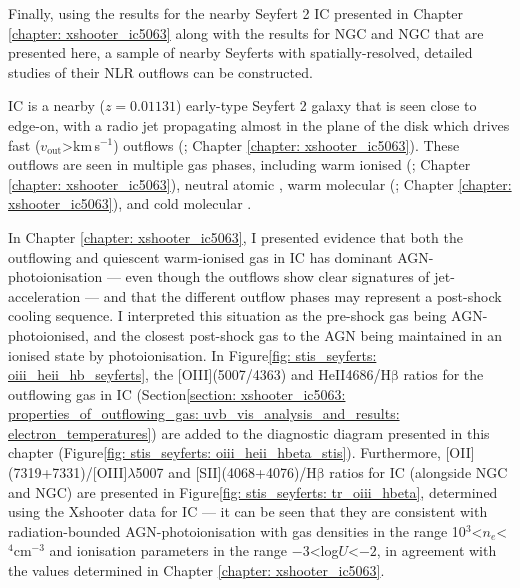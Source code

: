 Finally, using the results for the nearby Seyfert 2 IC presented in Chapter \ref{chapter: xshooter_ic5063} along with the results for NGC and NGC that are presented here, a sample of nearby Seyferts with spatially-resolved, detailed studies of their NLR outflows can be constructed.

IC is a nearby ($z=0.01131$) early-type Seyfert 2 galaxy that is seen close to edge-on, with a radio jet propagating almost in the plane of the disk which drives fast (\mbox{$v_\mathrm{out}$\;\textgreater{}\;km\,s$^{-1}$}) outflows (\citealt{Morganti1998, Oosterloo2000, Morganti2015, Mukherjee2018}; Chapter \ref{chapter: xshooter_ic5063}). These outflows are seen in multiple gas phases, including warm ionised (\citealt{Morganti2007, Sharp2010, Congiu2017, Venturi2021}; Chapter \ref{chapter: xshooter_ic5063}), neutral atomic \citep{Morganti1998, Oosterloo2000}, warm molecular (\citealt{Tadhunter2014}; Chapter \ref{chapter: xshooter_ic5063}), and cold molecular \citep{Morganti2013_IC5063, Morganti2015, Dasyra2016, Oosterloo2017}.

In Chapter \ref{chapter: xshooter_ic5063}, I presented evidence that both the outflowing and quiescent warm-ionised gas in IC has dominant AGN-photoionisation --- even though the outflows show clear signatures of jet-acceleration --- and that the different outflow phases may represent a post-shock cooling sequence. I interpreted this situation as the pre-shock gas being AGN-photoionised, and the closest post-shock gas to the AGN being maintained in an ionised state by photoionisation. In Figure\;\ref{fig: stis_seyferts: oiii_heii_hb_seyferts}, the [OIII](5007/4363) and HeII4686/H$\mathrm{\beta}$ ratios for the outflowing gas in IC (Section\;\ref{section: xshooter_ic5063: properties_of_outflowing_gas: uvb_vis_analysis_and_results: electron_temperatures}) are added to the diagnostic diagram presented in this chapter (Figure\;\ref{fig: stis_seyferts: oiii_heii_hbeta_stis}). Furthermore, [OII](7319+7331)/[OIII]$\lambda$5007 and [SII](4068+4076)/H$\mathrm{\beta}$ ratios for IC (alongside NGC and NGC) are presented in Figure\;\ref{fig: stis_seyferts: tr_oiii_hbeta}, determined using the Xshooter data for IC --- it can be seen that they are consistent with radiation-bounded AGN-photoionisation with gas densities in the range \mbox{10$^3$\;\textless\;$n_e$\;\textless{}$^4$\;cm$^{-3}$} and ionisation parameters in the range \mbox{$-3$\;\textless\;log\;$U$\;\textless\;$-2$}, in agreement with the values determined in Chapter \ref{chapter: xshooter_ic5063}. 

